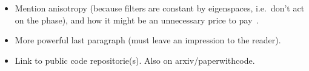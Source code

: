 \begin{itemize}
    \item Mention anisotropy (because filters are constant by eigenspaces, i.e.\ don't act on the phase), and how it might be an unnecessary price to pay~\cite{defferrard2020deepsphere}.
    \item More powerful last paragraph (must leave an impression to the reader).
    \item Link to public code repositorie(s). Also on arxiv/paperwithcode.
\end{itemize}
\clearpage
